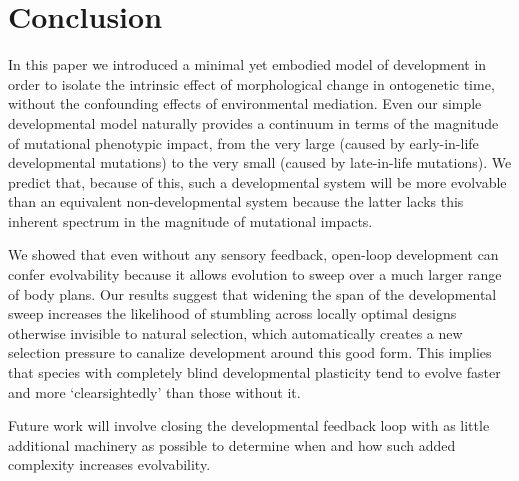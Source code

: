 \section{Conclusion}

In this paper we introduced a minimal yet embodied model of development in order to isolate the intrinsic effect of morphological change in ontogenetic time,
without the confounding effects of environmental mediation.
Even our simple developmental model naturally provides
a continuum in terms of the magnitude of mutational phenotypic impact,
from the very large (caused by early-in-life developmental mutations) 
to the very small (caused by late-in-life mutations). We predict that,
because of this, such a developmental system will be more evolvable
than an equivalent non-developmental system because the latter lacks
this inherent spectrum in the magnitude of mutational impacts.

We showed that even without any sensory feedback, open-loop development can confer evolvability because it allows evolution to sweep over a much larger range of body plans. Our results suggest that widening the span of the developmental sweep increases the likelihood of stumbling across locally optimal designs otherwise invisible to natural selection, which automatically creates a new selection pressure to canalize development around this good form.
This implies that species with completely blind developmental plasticity tend to evolve faster and more `clearsightedly' than those without it.

Future work will involve closing the developmental feedback loop with as little additional machinery as possible to determine when and how such added complexity increases evolvability.



